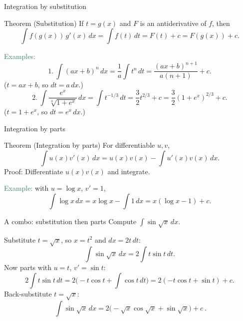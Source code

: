 \documentclass[11pt,aspectratio=169]{beamer}
\begin{document}
\begin{frame}{Integration by substitution}
\begin{block}{Theorem (Substitution)}
If $t=g(x)$ and $F$ is an antiderivative of $f$, then
\[
\int f(g(x))\,g'(x)\,dx=\int f(t)\,dt=F(t)+c=F(g(x))+c.
\]
\end{block}
\textcolor{SeaGreen}{Examples:}
\[
1.\ \int (ax+b)^n\,dx
= \frac{1}{a}\int t^n\,dt
= \frac{(ax+b)^{n+1}}{a(n+1)}+c.
\]
{\tiny ($t=ax+b$, so $dt=a\,dx$.)}
\[
2.\ \int \frac{e^x}{\sqrt[3]{1+e^x}}\,dx
= \int t^{-1/3}\,dt
= \frac{3}{2}t^{2/3}+c
= \frac{3}{2}(1+e^x)^{2/3}+c.
\]
{\tiny ($t=1+e^x$, so $dt=e^x\,dx$.)}
\end{frame}

\begin{frame}{Integration by parts}
\begin{block}{Theorem (Integration by parts)}
For differentiable $u,v$,
\[
\int u(x)v'(x)\,dx = u(x)v(x) - \int u'(x)v(x)\,dx.
\]
{\tiny Proof: Differentiate $u(x)v(x)$ and integrate.}
\end{block}
\textcolor{SeaGreen}{Example:} with $u=\log x$, $v'=1$,
\[
\int \log x\,dx = x\log x - \int 1\,dx = x(\log x-1)+c.
\]
\end{frame}

\begin{frame}{A combo: substitution then parts}
Compute $\int \sin\sqrt{x}\,dx$.
\bigskip

Substitute $t=\sqrt{x}$, so $x=t^2$ and $dx=2t\,dt$:
\[
\int \sin\sqrt{x}\,dx=2\int t\sin t\,dt.
\]
Now parts with $u=t$, $v'=\sin t$:
\[
2\int t\sin t\,dt
=2\Big(-t\cos t+\int \cos t\,dt\Big)
=2(-t\cos t+\sin t)+c.
\]
Back-substitute $t=\sqrt{x}$:
\[
\boxed{\ \int \sin\sqrt{x}\,dx=2\big(-\sqrt{x}\cos\sqrt{x}+\sin\sqrt{x}\big)+c\ }.
\]
\end{frame}
\end{document}
